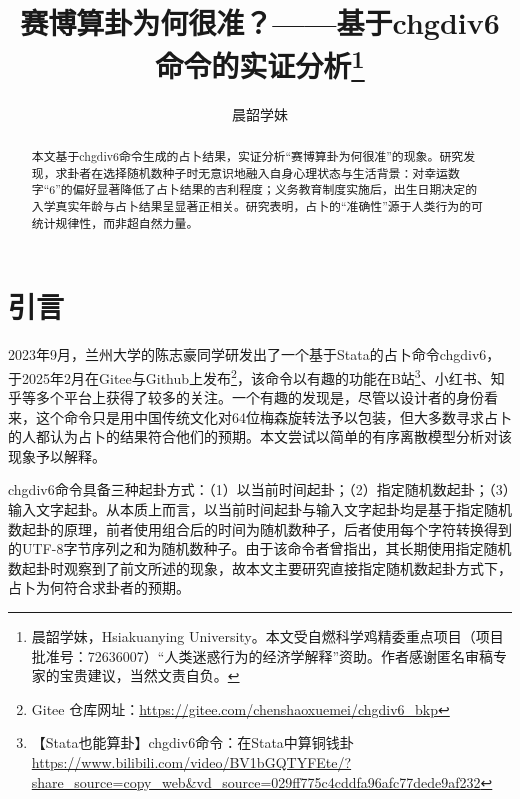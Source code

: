 \documentclass[11pt, a4paper, UTF8]{chinese-erj}
\begin{document}
\setcounter{page}{11} 

\title{赛博算卦为何很准？——基于chgdiv6命令的实证分析\thanks{晨韶学妹，Hsiakuanying University。本文受自燃科学鸡精委重点项目（项目批准号：72636007）“人类迷惑行为的经济学解释”资助。作者感谢匿名审稿专家的宝贵建议，当然文责自负。}}

\author{晨韶学妹}
\date{}

\maketitle

\begin{abstract}
本文基于chgdiv6命令生成的占卜结果，实证分析“赛博算卦为何很准”的现象。研究发现，求卦者在选择随机数种子时无意识地融入自身心理状态与生活背景：对幸运数字“6”的偏好显著降低了占卜结果的吉利程度；义务教育制度实施后，出生日期决定的入学真实年龄与占卜结果呈显著正相关。研究表明，占卜的“准确性”源于人类行为的可统计规律性，而非超自然力量。

\end{abstract}

\section{引言}

2023年9月，兰州大学的陈志豪同学研发出了一个基于Stata的占卜命令chgdiv6，于2025年2月在Gitee与Github上发布\footnote{Gitee 仓库网址：\url{https://gitee.com/chenshaoxuemei/chgdiv6_bkp}}，该命令以有趣的功能在B站\footnote{【Stata也能算卦】chgdiv6命令：在Stata中算铜钱卦 \url{https://www.bilibili.com/video/BV1bGQTYFEte/?share_source=copy_web&vd_source=029ff775c4cddfa96afc77dede9af232}}、小红书、知乎等多个平台上获得了较多的关注。一个有趣的发现是，尽管以设计者的身份看来，这个命令只是用中国传统文化对64位梅森旋转法予以包装，但大多数寻求占卜的人都认为占卜的结果符合他们的预期。本文尝试以简单的有序离散模型分析对该现象予以解释。

chgdiv6命令具备三种起卦方式：（1）以当前时间起卦；（2）指定随机数起卦；（3）输入文字起卦。从本质上而言，以当前时间起卦与输入文字起卦均是基于指定随机数起卦的原理，前者使用组合后的时间为随机数种子，后者使用每个字符转换得到的UTF-8字节序列之和为随机数种子。由于该命令者曾指出，其长期使用指定随机数起卦时观察到了前文所述的现象，故本文主要研究直接指定随机数起卦方式下，占卜为何符合求卦者的预期。
\end{document}
